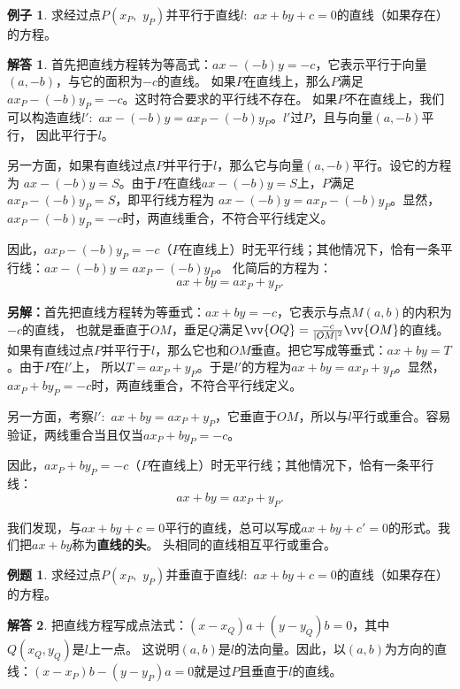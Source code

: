 \documentclass[12pt,UTF8]{ctexbook}
\theoremstyle{definition}
\newtheorem{ex}{例子}[section]
\newtheorem{et}{例题}[section]
\newtheorem*{so}{解答}
\theoremstyle{plain}
\begin{document}
\begin{ex}
    求经过点$P(x_P, \,\,y_P)$并平行于直线$l: \,\, ax + by + c = 0$的直线（如果存在）的方程。
\end{ex}
\begin{so}
首先把直线方程转为等高式：$ax - (-b)y = -c$，它表示平行于向量$(a, -b)$，与它的面积为$-c$的直线。
如果$P$在直线上，那么$P$满足$ax_P - (-b)y_P = -c$。这时符合要求的平行线不存在。
如果$P$不在直线上，我们可以构造直线$l' : \,\, ax - (-b)y = ax_P - (-b)y_P$。$l'$过$P$，且与向量$(a, -b)$平行，
因此平行于$l$。

另一方面，如果有直线过点$P$并平行于$l$，那么它与向量$(a, -b)$平行。设它的方程为
$ax - (-b)y = S$。由于$P$在直线$ax - (-b)y = S$上，$P$满足$ax_P - (-b)y_P = S$，即平行线方程为
$ax - (-b)y = ax_P - (-b)y_P$。显然，$ax_P - (-b)y_P = -c$时，两直线重合，不符合平行线定义。

因此，$ax_P - (-b)y_P = -c$（$P$在直线上）时无平行线；其他情况下，恰有一条平行线：$ax - (-b)y = ax_P - (-b)y_P$。
化简后的方程为：
$$ax + by = ax_P + y_P.$$

\textbf{另解：}首先把直线方程转为等垂式：$ax + by = -c$，它表示与点$M(a, b)$的内积为$-c$的直线，
也就是垂直于$OM$，垂足$Q$满足$\vv{OQ} = \frac{-c}{|OM|^2}\vv{OM}$的直线。
如果有直线过点$P$并平行于$l$，那么它也和$OM$垂直。把它写成等垂式：$ax + by = T$。由于$P$在$l'$上，
所以$T = ax_P + y_P$。于是$l'$的方程为$ax + by = ax_P + y_P$。显然，$ax_P + by_P = -c$时，两直线重合，不符合平行线定义。

另一方面，考察$l' : \,\, ax + by = ax_P + y_P$，它垂直于$OM$，所以与$l$平行或重合。容易验证，两线重合当且仅当$ax_P + by_P = -c$。

因此，$ax_P + by_P = -c$（$P$在直线上）时无平行线；其他情况下，恰有一条平行线：
$$ax + by = ax_P + y_P.$$

我们发现，与$ax + by + c = 0$平行的直线，总可以写成$ax + by + c' = 0$的形式。我们把$ax + by$称为\textbf{直线的头}。
头相同的直线相互平行或重合。
\end{so}

\begin{et}
    求经过点$P(x_P, \,\,y_P)$并垂直于直线$l: \,\, ax + by + c = 0$的直线（如果存在）的方程。
\end{et}
\begin{so}
    把直线方程写成点法式：$(x - x_Q)a + (y - y_Q)b = 0$，其中$Q(x_Q, y_Q)$是$l$上一点。
这说明$(a, b)$是$l$的法向量。因此，以$(a, b)$为方向的直线：$(x - x_P)b - (y - y_P)a = 0$就是过$P$且垂直于$l$的直线。
\end{so}
\end{document}
